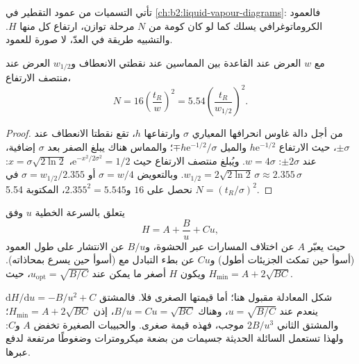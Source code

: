 تأتي التسميات من عمود التقطير في \cref{ch:b2:liquid-vapour-diagrams}: فالعمود الكروماتوغرافي
يسلك كما لو كان كومة من $N$ مرحلة توازن، ارتفاع كل منها $H$. والتشبيه طريقة
في العدّ، لا صورة للعمود.

\begin{proposition}\label{prop:b2:chromatography:plate-number}
مع $w$ العرض عند القاعدة بين المماسين عند نقطتي الانعطاف و$w_{1/2}$ العرض عند
منتصف الارتفاع،
\begin{equation*}
N = 16\left(\frac{t_R}{w}\right)^2 = 5.54\left(\frac{t_R}{w_{1/2}}\right)^2.
\end{equation*}
\end{proposition}

\begin{proof}
من أجل دالة غاوس انحرافها المعياري $\sigma$ وارتفاعها $h$، تقع نقطتا الانعطاف عند $\pm\sigma$،
حيث الارتفاع $h\mathrm e^{-1/2}$ والميل $\mp h\mathrm e^{-1/2}/\sigma$؛ والمماس هناك
يبلغ الصفر بعد $\sigma$ إضافية، عند $\pm2\sigma$: $w = 4\sigma$. ويُبلغ منتصف الارتفاع حيث
$\mathrm e^{-x^2/2\sigma^2} = 1/2$، $x = \sigma\sqrt{2\ln2}$: $w_{1/2} = 2\sqrt{2\ln2}\,\sigma \approx
2.355\,\sigma$. وبالتعويض $\sigma = w/4$ أو $\sigma = w_{1/2}/2.355$ في $N = (t_R/\sigma)^2$ نحصل على
$16$ و$2.355^2 = 5.545$، المكتوبة 5.54.
\end{proof}

\begin{proposition}\label{prop:b2:chromatography:van-deemter}
يتعلق  بالسرعة الخطية $u$  وفق
\begin{equation*}
H = A + \frac{B}{u} + Cu,
\end{equation*}
حيث يعبّر $A$ عن اختلاف المسارات عبر الحشوة، و$B/u$ عن الانتشار على طول العمود
(أسوأ حين تمكث الجزيئات أطول) و$Cu$ عن بطء التبادل مع  (أسوأ
حين يسرع  بمحاذاته). ويكون $H$ أصغر ما يمكن عند $u_{\mathrm{opt}} = \sqrt{B/C}$، حيث $H_{\min} =
A + 2\sqrt{BC}$.
\end{proposition}

\admitted

شكل المعادلة مقبول هنا؛ أما قيمتها الصغرى فلا. فالمشتق $\mathrm dH/\mathrm du = -B/u^2 + C$ ينعدم
عند $u = \sqrt{B/C}$، وهناك $B/u = Cu = \sqrt{BC}$، إذن $H_{\min} = A + 2\sqrt{BC}$؛ والمشتق
الثاني $2B/u^3$ موجب، فهذه قيمة صغرى. والحبيبات الصغيرة تخفض $A$ و$C$: ولهذا
تستعمل  السائلة الحديثة جسيمات من بضعة ميكرومترات وضغوطًا مرتفعة لدفع  عبرها.

